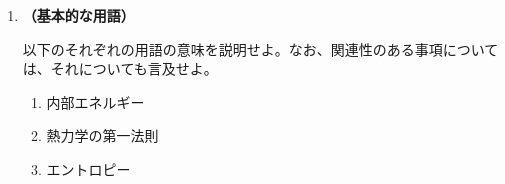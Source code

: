 \documentclass[uplatex,dvipdfmx,a4paper,11pt]{jsarticle}
\newcommand{\diff}{\mathrm d}
\begin{document}
\begin{enumerate}
\item
{\bf （基本的な用語）}

以下のそれぞれの用語の意味を説明せよ。なお、関連性のある事項については、それについても言及せよ。

\begin{enumerate}

\item
内部エネルギー

%
%

\item
熱力学の第一法則

%
%
%

\item
エントロピー

%
%


\end{enumerate}
\end{enumerate}
\end{document}
